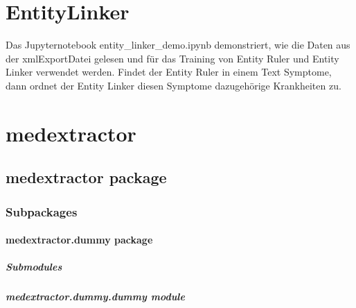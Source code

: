 \documentclass[letterpaper,10pt,english]{sphinxmanual}
\begin{document}
\chapter{Entity\sphinxhyphen{}Linker}
\label{\detokenize{readme:entity-linker}}
\sphinxAtStartPar
Das Jupyter\sphinxhyphen{}notebook entity\_linker\_demo.ipynb demonstriert, wie die
Daten aus der xml\sphinxhyphen{}Export\sphinxhyphen{}Datei gelesen und für das Training von Entity
Ruler und Entity Linker verwendet werden. Findet der Entity Ruler in
einem Text Symptome, dann ordnet der Entity Linker diesen Symptome
dazugehörige Krankheiten zu.

\sphinxstepscope


\chapter{medextractor}
\label{\detokenize{modules:medextractor}}\label{\detokenize{modules::doc}}
\sphinxstepscope


\section{medextractor package}
\label{\detokenize{medextractor:medextractor-package}}\label{\detokenize{medextractor::doc}}

\subsection{Subpackages}
\label{\detokenize{medextractor:subpackages}}
\sphinxstepscope


\subsubsection{medextractor.dummy package}
\label{\detokenize{medextractor.dummy:medextractor-dummy-package}}\label{\detokenize{medextractor.dummy::doc}}

\paragraph{Submodules}
\label{\detokenize{medextractor.dummy:submodules}}

\paragraph{medextractor.dummy.dummy module}
\label{\detokenize{medextractor.dummy:module-medextractor.dummy.dummy}}\label{\detokenize{medextractor.dummy:medextractor-dummy-dummy-module}}
\end{document}
